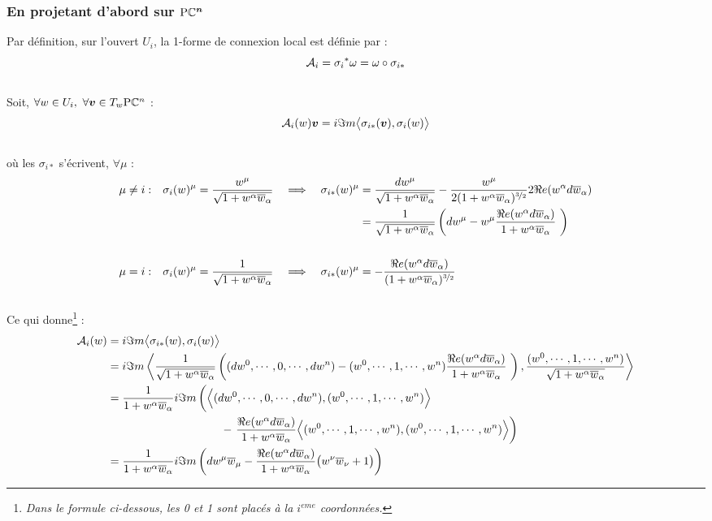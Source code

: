 \subsubsection{\wip En projetant d'abord sur $\bf{\PC{n}}$}

Par définition, sur l'ouvert $U_i$, la 1-forme de connexion local est définie par :
\[\locconn_i = {\sigma_i}^*\conn = \conn\circ \sigma_{i*}\]
\\
Soit, $\forall w\in U_i,\ \forall \bf{v}\in\tg[w]{\PC{n}}$ :
\[\locconn_i(w)\bf{v}= i\Im m \big\langle \sigma_{i*}(\bf{v}), \sigma_i(w) \big\rangle\]
\\
où les $\sigma_{i*}$ s'écrivent, $\forall \mu$ :
\begin{align*}
	\mu &\neq i : &  \sigma_i(w)^\mu = \frac{w^\mu}{\sqrt{1 + w^\alpha\congu{w}_\alpha}}\quad \Lr\quad
	\sigma_{i*}(w)^\mu &= \frac{dw^\mu}{\sqrt{1 + w^\alpha\congu{w}_\alpha}} - \frac{w^\mu}{2(1 + w^\alpha\congu{w}_\alpha)^{\nicefrac{3}{2}}}2\Re e(w^\alpha d\congu{w}_\alpha) \\
	&  &  &= \frac{1}{\sqrt{1 + w^\alpha\congu{w}_\alpha}}\left(dw^\mu - w^\mu \frac{\Re e(w^\alpha d\congu{w}_\alpha)}{1 + w^\alpha\congu{w}_\alpha}\ \right)
	\\ \\
	\mu &= i :  &  \sigma_i(w)^\mu = \frac{1}{\sqrt{1 + w^\alpha\congu{w}_\alpha}}\quad \Lr\quad
	\sigma_{i*}(w)^\mu &= - \frac{\Re e(w^\alpha d\congu{w}_\alpha)}{(1 + w^\alpha\congu{w}_\alpha)^{\nicefrac{3}{2}}}
\end{align*}
\\
Ce qui donne\footnote{\itshape
	Dans le formule ci-dessous, les 0 et 1 sont placés à la $i^{eme}$ coordonnées.
} :
\begin{align*}
	\locconn_i(w) &= i\Im m \big\langle \sigma_{i*}(w), \sigma_i(w) \big\rangle \\
	&= i\Im m \left\langle \frac{1}{\sqrt{1 + w^\alpha\congu{w}_\alpha}}\left((dw^0,\cdots , 0, \cdots, dw^n) - (w^0,\cdots , 1, \cdots, w^n) \frac{\Re e(w^\alpha d\congu{w}_\alpha)}{1 + w^\alpha\congu{w}_\alpha}\ \right), \frac{(w^0,\cdots , 1, \cdots, w^n)}{\sqrt{1 + w^\alpha\congu{w}_\alpha}} \right\rangle \\
	&= \frac{1}{1 + w^\alpha\congu{w}_\alpha} i\Im m \left( \Big\langle (dw^0,\cdots , 0, \cdots, dw^n), (w^0,\cdots , 1, \cdots, w^n) \Big\rangle \bigg. \right. \\
	&\qquad\qquad\qquad\qquad\qquad - \left.  \frac{\Re e(w^\alpha d\congu{w}_\alpha)}{1 + w^\alpha\congu{w}_\alpha}\Big\langle (w^0,\cdots , 1, \cdots, w^n) , (w^0,\cdots , 1, \cdots, w^n) \Big\rangle \right) \\
	&= \frac{1}{1 + w^\alpha\congu{w}_\alpha} i\Im m \left( dw^\mu\congu{w}_\mu -  \frac{\Re e(w^\alpha d\congu{w}_\alpha)}{1 + w^\alpha\congu{w}_\alpha}\big( w^\nu\congu{w}_\nu +1 \big) \right)
\end{align*}
